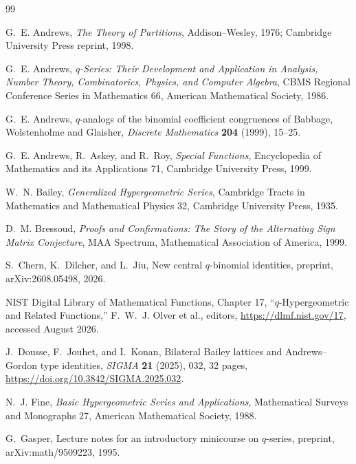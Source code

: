 \documentclass[11pt,a4paper,oneside,openany]{book}
\theoremstyle{definition}
\theoremstyle{remark}
\begin{document}
\begin{thebibliography}{99}

G.~E. Andrews,
\emph{The Theory of Partitions},
Addison--Wesley, 1976; Cambridge University Press reprint, 1998.

G.~E. Andrews,
\emph{$q$-Series: Their Development and Application in Analysis, Number Theory, Combinatorics, Physics, and Computer Algebra},
CBMS Regional Conference Series in Mathematics 66, American Mathematical Society, 1986.

G.~E. Andrews,
$q$-analogs of the binomial coefficient congruences of Babbage, Wolstenholme and Glaisher,
\emph{Discrete Mathematics} \textbf{204} (1999), 15--25.

G.~E. Andrews, R.~Askey, and R.~Roy,
\emph{Special Functions},
Encyclopedia of Mathematics and its Applications 71, Cambridge University Press, 1999.

W.~N. Bailey,
\emph{Generalized Hypergeometric Series},
Cambridge Tracts in Mathematics and Mathematical Physics 32, Cambridge University Press, 1935.

D.~M. Bressoud,
\emph{Proofs and Confirmations: The Story of the Alternating Sign Matrix Conjecture},
MAA Spectrum, Mathematical Association of America, 1999.

S.~Chern, K.~Dilcher, and L.~Jiu,
New central $q$-binomial identities,
preprint, arXiv:2608.05498, 2026.

NIST Digital Library of Mathematical Functions,
Chapter 17, ``$q$-Hypergeometric and Related Functions,''
F.~W.~J. Olver et al., editors, \url{https://dlmf.nist.gov/17}, accessed August 2026.

J.~Dousse, F.~Jouhet, and I.~Konan,
Bilateral Bailey lattices and Andrews--Gordon type identities,
\emph{SIGMA} \textbf{21} (2025), 032, 32 pages,
\url{https://doi.org/10.3842/SIGMA.2025.032}.

N.~J. Fine,
\emph{Basic Hypergeometric Series and Applications},
Mathematical Surveys and Monographs 27, American Mathematical Society, 1988.

{\raggedright
G.~Gasper,
Lecture notes for an introductory mini\-course on $q$-series,
preprint, arXiv:math/9509223, 1995.
\par}


\end{thebibliography}
\end{document}
